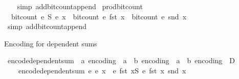 \begin{isabellebody}
%
\isadelimproof
\ \ %
\endisadelimproof
%
\isatagproof
{}\isamarkupfalse%
\ {\isacharparenleft}{\kern0pt}simp\ add{\isacharcolon}{\kern0pt}bit{\isacharunderscore}{\kern0pt}count{\isacharunderscore}{\kern0pt}append{\isacharparenright}{\kern0pt}%
\endisatagproof
{\isafoldproof}%
%
\isadelimproof
\isanewline
%
\endisadelimproof
\isanewline
{}\isamarkupfalse%
\ prod{\isacharunderscore}{\kern0pt}bit{\isacharunderscore}{\kern0pt}count{\isacharunderscore}{\kern0pt}{}{\isacharcolon}{\kern0pt}\isanewline
\ \ {\isachardoublequoteopen}bit{\isacharunderscore}{\kern0pt}count\ {\isacharparenleft}{\kern0pt}{\isacharparenleft}{\kern0pt}e{}\ {\isasymtimes}\isactrlsub S\ e{}{\isacharparenright}{\kern0pt}\ x{\isacharparenright}{\kern0pt}\ {\isacharequal}{\kern0pt}\ bit{\isacharunderscore}{\kern0pt}count\ {\isacharparenleft}{\kern0pt}e{}\ {\isacharparenleft}{\kern0pt}fst\ x{\isacharparenright}{\kern0pt}{\isacharparenright}{\kern0pt}\ {\isacharplus}{\kern0pt}\ bit{\isacharunderscore}{\kern0pt}count\ {\isacharparenleft}{\kern0pt}e{}\ {\isacharparenleft}{\kern0pt}snd\ x{\isacharparenright}{\kern0pt}{\isacharparenright}{\kern0pt}{\isachardoublequoteclose}\isanewline
%
\isadelimproof
\ \ %
\endisadelimproof
%
\isatagproof
{}\isamarkupfalse%
\ {\isacharparenleft}{\kern0pt}simp\ add{\isacharcolon}{\kern0pt}bit{\isacharunderscore}{\kern0pt}count{\isacharunderscore}{\kern0pt}append{\isacharparenright}{\kern0pt}%
\endisatagproof
{\isafoldproof}%
%
\isadelimproof
%
\endisadelimproof
%
\begin{isamarkuptext}%
Encoding for dependent sums%
\end{isamarkuptext}\isamarkuptrue%
\isamarkupfalse%
\ encode{\isacharunderscore}{\kern0pt}dependent{\isacharunderscore}{\kern0pt}sum\ {\isacharcolon}{\kern0pt}{\isacharcolon}{\kern0pt}\ {\isachardoublequoteopen}{\isacharprime}{\kern0pt}a\ encoding\ {\isasymRightarrow}\ {\isacharparenleft}{\kern0pt}{\isacharprime}{\kern0pt}a\ {\isasymRightarrow}\ {\isacharprime}{\kern0pt}b\ encoding{\isacharparenright}{\kern0pt}\ {\isasymRightarrow}\ {\isacharparenleft}{\kern0pt}{\isacharprime}{\kern0pt}a\ {\isasymtimes}\ {\isacharprime}{\kern0pt}b{\isacharparenright}{\kern0pt}\ encoding{\isachardoublequoteclose}\ {\isacharparenleft}{\kern0pt}\ {\isachardoublequoteopen}{\isasymtimes}\isactrlsub D{\isachardoublequoteclose}\ {}{}{\isacharparenright}{\kern0pt}\isanewline
\ \ \ \isanewline
\ \ \ \ {\isachardoublequoteopen}encode{\isacharunderscore}{\kern0pt}dependent{\isacharunderscore}{\kern0pt}sum\ e{}\ e{}\ x\ {\isacharequal}{\kern0pt}\ e{}\ {\isacharparenleft}{\kern0pt}fst\ x{\isacharparenright}{\kern0pt}{\isacharat}{\kern0pt}\isactrlsub S\ e{}\ {\isacharparenleft}{\kern0pt}fst\ x{\isacharparenright}{\kern0pt}\ {\isacharparenleft}{\kern0pt}snd\ x{\isacharparenright}{\kern0pt}{\isachardoublequoteclose}\isanewline

\end{isabellebody}
